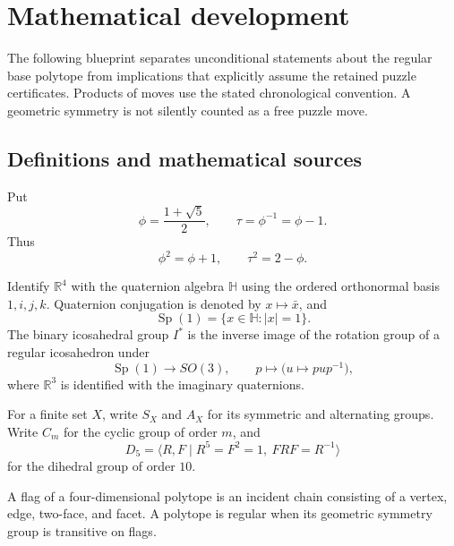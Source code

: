 \documentclass[
  10pt,
  a4paper,
]{article}
\begin{document}
\newpage

\section{Mathematical development}\label{mathematical-development}

The following blueprint separates unconditional statements about the
regular base polytope from implications that explicitly assume the
retained puzzle certificates. Products of moves use the stated
chronological convention. A geometric symmetry is not silently counted
as a free puzzle move.

\subsection{Definitions and mathematical
sources}\label{definitions-and-mathematical-sources}

Put \begin{equation}
\phi=\frac{1+\sqrt5}{2},\qquad \tau=\phi^{-1}=\phi-1.
\end{equation} Thus \begin{equation}
\phi^2=\phi+1,\qquad \tau^2=2-\phi.
\end{equation}

Identify \(\mathbb R^4\) with the quaternion algebra \(\mathbb H\) using
the ordered orthonormal basis \(1,i,j,k\). Quaternion conjugation is
denoted by \(x\mapsto\bar x\), and \begin{equation}
\operatorname{Sp}(1)=\{x\in\mathbb H:|x|=1\}.
\end{equation} The binary icosahedral group \(I^*\) is the inverse image
of the rotation group of a regular icosahedron under \begin{equation}
\operatorname{Sp}(1)\longrightarrow SO(3),\qquad
p\longmapsto\bigl(u\mapsto pup^{-1}\bigr),
\end{equation} where \(\mathbb R^3\) is identified with the imaginary
quaternions.

For a finite set \(X\), write \(S_X\) and \(A_X\) for its symmetric and
alternating groups. Write \(C_m\) for the cyclic group of order \(m\),
and \begin{equation}
D_5=\langle R,F\mid R^5=F^2=1,\ FRF=R^{-1}\rangle
\end{equation} for the dihedral group of order \(10\).

A flag of a four-dimensional polytope is an incident chain consisting of
a vertex, edge, two-face, and facet. A polytope is regular when its
geometric symmetry group is transitive on flags.
\end{document}
